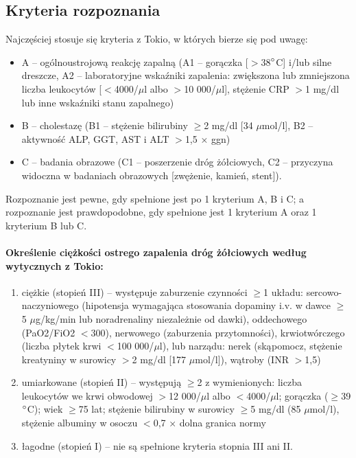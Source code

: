 \subsection{Kryteria rozpoznania}

Najczęściej stosuje się kryteria z Tokio, w których bierze się pod uwagę:
\begin{itemize}
    \item A – ogólnoustrojową reakcję zapalną (A1 – gorączka [$>$38$\degree$C] i/lub silne dreszcze, A2 – laboratoryjne wskaźniki zapalenia: zwiększona lub zmniejszona liczba leukocytów [$<$4000/$\mu$l albo $>$10 000/$\mu$l], stężenie CRP $>$1 mg/dl lub inne wskaźniki stanu zapalnego)

    \item B – cholestazę (B1 – stężenie bilirubiny $\geq$2 mg/dl [34 $\mu$mol/l], B2 – aktywność ALP, GGT, AST i ALT $>$1,5 × ggn)

    \item C – badania obrazowe (C1 – poszerzenie dróg żółciowych, C2 – przyczyna widoczna w badaniach obrazowych [zwężenie, kamień, stent]).
\end{itemize}

Rozpoznanie jest pewne, gdy spełnione jest po 1 kryterium A, B i C; a rozpoznanie jest prawdopodobne, gdy spełnione jest 1 kryterium A oraz 1 kryterium B lub C.

\paragraph{Określenie ciężkości ostrego zapalenia dróg żółciowych według wytycznych z Tokio:}

\begin{enumerate}
    \item ciężkie (stopień III) – występuje zaburzenie czynności $\geq$1 układu: sercowo-naczyniowego (hipotensja wymagająca stosowania dopaminy i.v. w dawce $\geq$5 $\mu$g/kg/min lub noradrenaliny niezależnie od dawki), oddechowego (PaO2/FiO2 $<$300), nerwowego (zaburzenia przytomności), krwiotwórczego (liczba płytek krwi $<$100 000/$\mu$l), lub narządu: nerek (skąpomocz, stężenie kreatyniny w surowicy $>$2 mg/dl [177 $\mu$mol/l]), wątroby (INR $>$1,5)

    \item umiarkowane (stopień II) – występują $\geq$2 z wymienionych: liczba leukocytów we krwi obwodowej $>$12 000/$\mu$l albo $<$4000/$\mu$l; gorączka ($\geq$39$\degree$C); wiek $\geq$75 lat; stężenie bilirubiny w surowicy $\geq$5 mg/dl (85 $\mu$mol/l), stężenie albuminy w osoczu $<$0,7 × dolna granica normy

    \item łagodne (stopień I) – nie są spełnione kryteria stopnia III ani II.
\end{enumerate}

